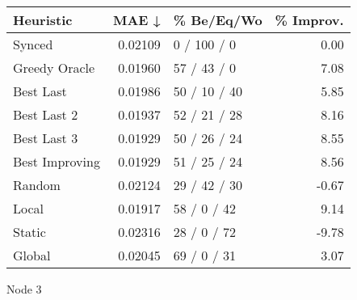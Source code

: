 \begin{tabular}{lrlr}
\toprule
\textbf{Heuristic} & \textbf{MAE ↓} & \textbf{\% Be/Eq/Wo} & \textbf{\% Improv.} \\
\midrule
            Synced &        0.02109 &          0 / 100 / 0 &                0.00 \\
     Greedy Oracle &        0.01960 &          57 / 43 / 0 &                7.08 \\
         Best Last &        0.01986 &         50 / 10 / 40 &                5.85 \\
       Best Last 2 &        0.01937 &         52 / 21 / 28 &                8.16 \\
       Best Last 3 &        0.01929 &         50 / 26 / 24 &                8.55 \\
    Best Improving &        0.01929 &         51 / 25 / 24 &                8.56 \\
            Random &        0.02124 &         29 / 42 / 30 &               -0.67 \\
             Local &        0.01917 &          58 / 0 / 42 &                9.14 \\
            Static &        0.02316 &          28 / 0 / 72 &               -9.78 \\
            Global &        0.02045 &          69 / 0 / 31 &                3.07 \\
\bottomrule
\end{tabular}
\caption{Node 3}
\label{tab:non_lr01_le2_bs4_3}
